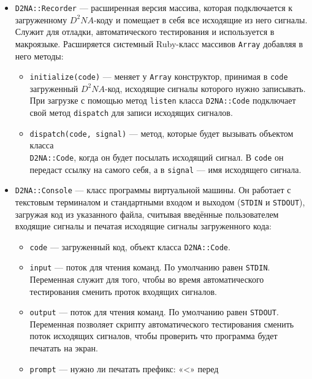 \documentclass[utf8,a5paper,portrait,10pt]{eskdtext}
\begin{document}
\begin{itemize}
  \item \texttt{D2NA::Recorder} — расширенная версия массива, которая
        подключается к загруженному $D^2NA$-коду и помещает в себя все
        исходящие из него сигналы. Служит для отладки, автоматического
        тестирования и используется в макроязыке. Расширяется системный
        Ruby-класс массивов \texttt{Array} добавляя в него методы:
       \begin{itemize}
          \item \texttt{initialize(code)} — меняет у \texttt{Array}
                конструктор, принимая в \texttt{code} загруженный $D^2NA$-код,
                исходящие сигналы которого нужно записывать. При загрузке
                с помощью метод \texttt{listen} класса \texttt{D2NA::Code}
                подключает свой метод \texttt{dispatch} для записи исходящих
                сигналов.
          \item \texttt{dispatch(code, signal)} — метод, которые будет вызывать
                объектом класса \\ \texttt{D2NA::Code}, когда он будет посылать
                исходящий сигнал. В \texttt{code} он передаст ссылку на самого
                себя, а в \texttt{signal} — имя исходящего сигнала.
        \end{itemize}
  \item \texttt{D2NA::Console} — класс программы виртуальной машины. Он
        работает с текстовым терминалом и стандартными входом и выходом
        (\texttt{STDIN} и \texttt{STDOUT}), загружая код из указанного файла,
        считывая введённые пользователем входящие сигналы и печатая исходящие
        сигналы загруженного кода:
        \begin{itemize}
          \item \texttt{code} — загруженный код, объект класса
                \texttt{D2NA::Code}.
          \item \texttt{input} — поток для чтения команд. По умолчанию равен
                \texttt{STDIN}. Переменная служит для того, чтобы во время
                автоматического тестирования сменить проток входящих сигналов.
          \item \texttt{output} — поток для чтения команд. По умолчанию равен
                \texttt{STDOUT}. Переменная позволяет скрипту автоматического
                тестирования сменить поток исходящих сигналов, чтобы проверить
                что программа будет печатать на экран.
          \item \texttt{prompt} — нужно ли печатать префикс: «<» перед

\end{itemize}
\end{itemize}
\end{document}

